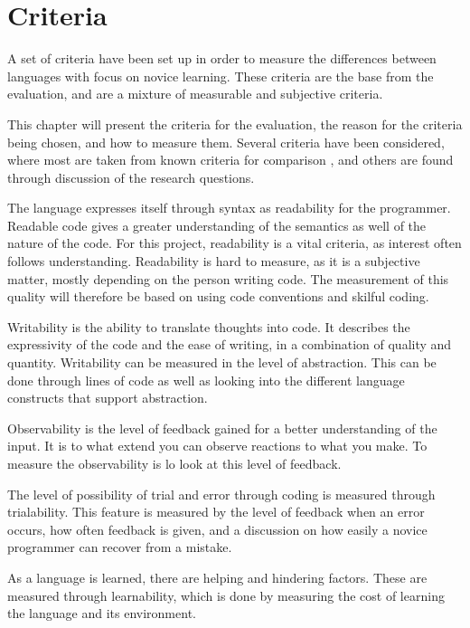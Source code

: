 \chapter{Criteria}
\label{chap:criteria}
A set of criteria have been set up in order to measure the differences between languages with focus on novice learning. These criteria are the base from the evaluation, and are a mixture of measurable and subjective criteria.

This chapter will present the criteria for the evaluation, the reason for the criteria being chosen, and how to measure them. Several criteria have been considered, where most are taken from known criteria for comparison \cite{design_criteria1} \cite{design_criteria2}, and others are found through discussion of the research questions.

\begin{description}[style=nextline]
\item[Readability] The language expresses itself through syntax as readability for the programmer. Readable code gives a greater understanding of the semantics as well of the nature of the code. For this project, readability is a vital criteria, as interest often follows understanding. Readability is hard to measure, as it is a subjective matter, mostly depending on the person writing code. The measurement of this quality will therefore be based on using code conventions and skilful coding.
\item[Writability] Writability is the ability to translate thoughts into code. It describes the expressivity of the code and the ease of writing, in a combination of quality and quantity. Writability can be measured in the level of abstraction. This can be done through lines of code as well as looking into the different language constructs that support abstraction.
\item[Observability] Observability is the level of feedback gained for a better understanding of the input. It is to what extend you can observe reactions to what you make. To measure the observability is lo look at this level of feedback.
\item[Trialability] The level of possibility of trial and error through coding is measured through trialability. This feature is measured by the level of feedback when an error occurs, how often feedback is given, and a discussion on how easily a novice programmer can recover from a mistake.
\item[Learnability] As a language is learned, there are helping and hindering factors. These are measured through learnability, which is done by measuring the cost of learning the language and its environment.

\end{description}
